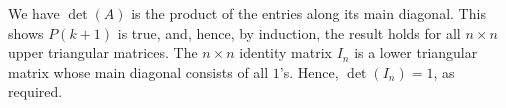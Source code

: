 \begin{enumerate}
We have $\det(A)$ is the product of the entries along its main diagonal.  This shows $P(k+1)$ is true, and, hence, by induction, the result holds for all $n \times n$ upper triangular matrices. The $n \times n$ identity matrix $I_{n}$ is a lower triangular matrix whose main diagonal consists of all $1$'s.  Hence,  $\det\left(I_{n}\right) = 1$, as required.

\end{enumerate}

\closegraphsfile